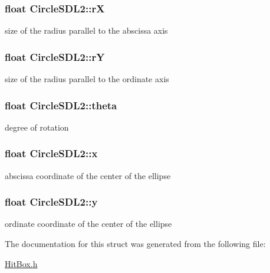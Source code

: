 \subsubsection[{\texorpdfstring{rX}{rX}}]{\setlength{\rightskip}{0pt plus 5cm}float Circle\+S\+D\+L2\+::rX}\hypertarget{structCircleSDL2_a3e1bbbd4b8e28aaa64d556b5d44c38c7}{}\label{structCircleSDL2_a3e1bbbd4b8e28aaa64d556b5d44c38c7}
size of the radius parallel to the abscissa axis 
\subsubsection[{\texorpdfstring{rY}{rY}}]{\setlength{\rightskip}{0pt plus 5cm}float Circle\+S\+D\+L2\+::rY}\hypertarget{structCircleSDL2_a5efd23d10522c9e2876ee3680bd9d73a}{}\label{structCircleSDL2_a5efd23d10522c9e2876ee3680bd9d73a}
size of the radius parallel to the ordinate axis 
\subsubsection[{\texorpdfstring{theta}{theta}}]{\setlength{\rightskip}{0pt plus 5cm}float Circle\+S\+D\+L2\+::theta}\hypertarget{structCircleSDL2_aa6558f4c810b4ef38b1c5bc7cac27634}{}\label{structCircleSDL2_aa6558f4c810b4ef38b1c5bc7cac27634}
degree of rotation 
\subsubsection[{\texorpdfstring{x}{x}}]{\setlength{\rightskip}{0pt plus 5cm}float Circle\+S\+D\+L2\+::x}\hypertarget{structCircleSDL2_ad235379713c16cff4df569ebd818aa4e}{}\label{structCircleSDL2_ad235379713c16cff4df569ebd818aa4e}
abscissa coordinate of the center of the ellipse 
\subsubsection[{\texorpdfstring{y}{y}}]{\setlength{\rightskip}{0pt plus 5cm}float Circle\+S\+D\+L2\+::y}\hypertarget{structCircleSDL2_a52d1cb29f05a93e3f127e1956a9714ec}{}\label{structCircleSDL2_a52d1cb29f05a93e3f127e1956a9714ec}
ordinate coordinate of the center of the ellipse 

The documentation for this struct was generated from the following file\+:\begin{DoxyCompactItemize}
\item 
\hyperlink{HitBox_8h}{Hit\+Box.\+h}\end{DoxyCompactItemize}
